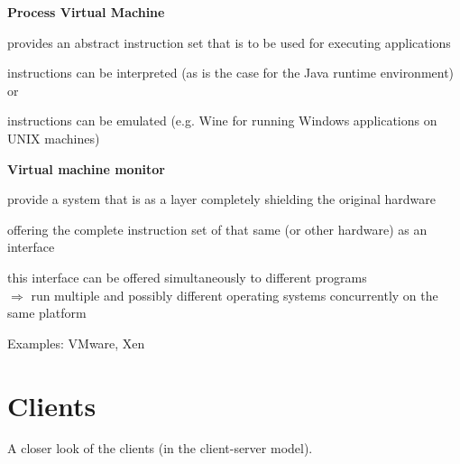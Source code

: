 \begin{compactenum}	
	\item \textbf{Process Virtual Machine}	
	\begin{compactitem}
		\item provides an abstract instruction set that is to be used for executing applications
		\item instructions can be interpreted (as is the case for the Java runtime environment) or
		\item instructions can be emulated (e.g. Wine for running Windows applications on UNIX machines)
	\end{compactitem}
	
	\item \textbf{Virtual machine monitor}	
	\begin{compactitem}
		\item provide a system that is as a layer completely shielding the original hardware
		\item offering the complete instruction set of that same (or other hardware) as an interface
		\item this interface can be offered simultaneously to different programs\\
		$\Rightarrow$ run multiple and possibly different operating systems concurrently on the same platform
		\item Examples: VMware, Xen		
	\end{compactitem}
\end{compactenum}


\section{Clients}

A closer look of the clients (in the client-server model).

